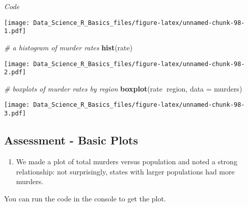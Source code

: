 \documentclass[]{article}
\newenvironment{Shaded}{\begin{snugshade}}{\end{snugshade}}
\newcommand{\CommentTok}[1]{\textcolor[rgb]{0.56,0.35,0.01}{\textit{#1}}}
\newcommand{\DataTypeTok}[1]{\textcolor[rgb]{0.13,0.29,0.53}{#1}}
\newcommand{\DecValTok}[1]{\textcolor[rgb]{0.00,0.00,0.81}{#1}}
\newcommand{\KeywordTok}[1]{\textcolor[rgb]{0.13,0.29,0.53}{\textbf{#1}}}
\newcommand{\NormalTok}[1]{#1}
\newcommand{\OperatorTok}[1]{\textcolor[rgb]{0.81,0.36,0.00}{\textbf{#1}}}
\newcommand{\StringTok}[1]{\textcolor[rgb]{0.31,0.60,0.02}{#1}}
\providecommand{\tightlist}{%
  \setlength{\itemsep}{0pt}\setlength{\parskip}{0pt}}
\begin{document}
\emph{Code}

\begin{Shaded}
\end{Shaded}

\texttt{[image: Data\_Science\_R\_Basics\_files/figure-latex/unnamed-chunk-98-1.pdf]}

\begin{Shaded}
\begin{Highlighting}[]
\CommentTok{# a histogram of murder rates}
\KeywordTok{hist}\NormalTok{(rate)}
\end{Highlighting}
\end{Shaded}

\texttt{[image: Data\_Science\_R\_Basics\_files/figure-latex/unnamed-chunk-98-2.pdf]}

\begin{Shaded}
\begin{Highlighting}[]
\CommentTok{# boxplots of murder rates by region}
\KeywordTok{boxplot}\NormalTok{(rate}\OperatorTok{~}\NormalTok{region, }\DataTypeTok{data =}\NormalTok{ murders)}
\end{Highlighting}
\end{Shaded}

\texttt{[image: Data\_Science\_R\_Basics\_files/figure-latex/unnamed-chunk-98-3.pdf]}

\hypertarget{assessment---basic-plots}{%
\subsection{Assessment - Basic Plots}\label{assessment---basic-plots}}

\begin{enumerate}
\def\labelenumi{\arabic{enumi}.}
\tightlist
\item
  We made a plot of total murders versus population and noted a strong
  relationship: not surprisingly, states with larger populations had
  more murders.
\end{enumerate}

You can run the code in the console to get the plot.
\end{document}
